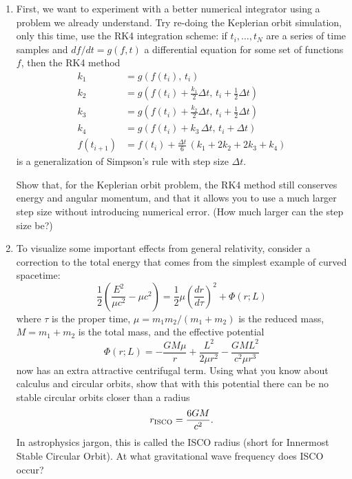 \documentclass[11pt]{article}
\begin{document}
\begin{enumerate}

\item First, we want to experiment with a better numerical integrator using a problem we already understand. Try re-doing the Keplerian orbit simulation, only this time, use the RK4 integration scheme: if $t_i, \dots, t_N$ are a series of time samples and $df/dt = g(f, t)$ a differential equation for some set of functions $f$, then the RK4 method
\begin{align*}
k_1 &= g(f(t_i), \, t_i) \\
k_2 &= g\left(f(t_i) + \frac{k_1}{2}\Delta t, \, t_i + \frac{1}{2}\Delta t\right) \\
k_3 &= g\left(f(t_i) + \frac{k_2}{2}\Delta t, \, t_i + \frac{1}{2}\Delta t\right) \\
k_4 &= g(f(t_i) + k_3\,\Delta t, \, t_i + \Delta t) \\
f(t_{i+1}) &= f(t_i) + \frac{\Delta t}{6}\,\left(k_1 + 2k_2 + 2k_3 + k_4\right)
\end{align*}
is a generalization of Simpson's rule with step size $\Delta t$.

\hspace{15pt} Show that, for the Keplerian orbit problem, the RK4 method still conserves energy and angular momentum, and that it allows you to use a much larger step size without introducing numerical error. (How much larger can the step size be?)

\item To visualize some important effects from general relativity, consider a correction to the total energy that comes from the simplest example of curved spacetime:
\begin{equation}
\frac{1}{2} \left(\frac{E^2}{\mu c^2} - \mu c^2\right) = \frac{1}{2}\mu\left(\frac{dr}{d\tau}\right)^2 + \Phi(r; L)
\end{equation}
where $\tau$ is the proper time, $\mu = m_1 m_2/(m_1 + m_2)$ is the reduced mass, $M = m_1 + m_2$ is the total mass, and the effective potential
\begin{equation}\label{eq:potential}
\Phi(r; L) = -\frac{GM\mu}{r} + \frac{L^2}{2\mu r^2} - \frac{GML^2}{c^2\mu r^3}
\end{equation}
now has an extra attractive centrifugal term. Using what you know about calculus and circular orbits, show that with this potential there can be no stable circular orbits closer than a radius
\begin{equation}\label{eq:ISCO}
r_{\rm ISCO} = \frac{6GM}{c^2}.
\end{equation}
In astrophysics jargon, this is called the ISCO radius (short for Innermost Stable Circular Orbit). At what gravitational wave frequency does ISCO occur?


\end{enumerate}
\end{document}
